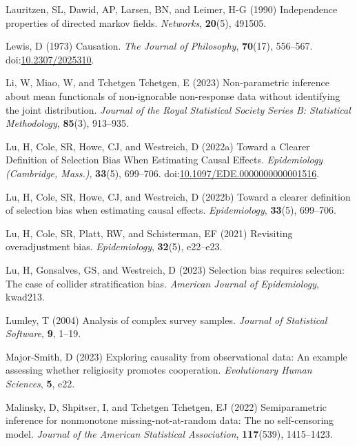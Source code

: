 \documentclass[
  singlecolumn]{article}
\newlength{\cslhangindent}
\newenvironment{CSLReferences}[2] %
 {\begin{list}{}{%
  \setlength{\itemindent}{0pt}
  \setlength{\leftmargin}{0pt}
  \setlength{\parsep}{0pt}
  \ifodd #1
   \setlength{\leftmargin}{\cslhangindent}
   \setlength{\itemindent}{-1\cslhangindent}
  \fi
  \setlength{\itemsep}{#2\baselineskip}}}
 {\end{list}}
\begin{document}
\begin{CSLReferences}{1}{0}
Lauritzen, SL, Dawid, AP, Larsen, BN, and Leimer, H-G (1990)
Independence properties of directed markov fields. \emph{Networks},
\textbf{20}(5), 491505.

Lewis, D (1973) Causation. \emph{The Journal of Philosophy},
\textbf{70}(17), 556--567.
doi:\href{https://doi.org/10.2307/2025310}{10.2307/2025310}.

Li, W, Miao, W, and Tchetgen Tchetgen, E (2023) Non-parametric inference
about mean functionals of non-ignorable non-response data without
identifying the joint distribution. \emph{Journal of the Royal
Statistical Society Series B: Statistical Methodology}, \textbf{85}(3),
913--935.

Lu, H, Cole, SR, Howe, CJ, and Westreich, D (2022a) Toward a Clearer
Definition of Selection Bias When Estimating Causal Effects.
\emph{Epidemiology (Cambridge, Mass.)}, \textbf{33}(5), 699--706.
doi:\href{https://doi.org/10.1097/EDE.0000000000001516}{10.1097/EDE.0000000000001516}.

Lu, H, Cole, SR, Howe, CJ, and Westreich, D (2022b) Toward a clearer
definition of selection bias when estimating causal effects.
\emph{Epidemiology}, \textbf{33}(5), 699--706.

Lu, H, Cole, SR, Platt, RW, and Schisterman, EF (2021) Revisiting
overadjustment bias. \emph{Epidemiology}, \textbf{32}(5), e22--e23.

Lu, H, Gonsalves, GS, and Westreich, D (2023) Selection bias requires
selection: The case of collider stratification bias. \emph{American
Journal of Epidemiology}, kwad213.

Lumley, T (2004) Analysis of complex survey samples. \emph{Journal of
Statistical Software}, \textbf{9}, 1--19.

Major-Smith, D (2023) Exploring causality from observational data: An
example assessing whether religiosity promotes cooperation.
\emph{Evolutionary Human Sciences}, \textbf{5}, e22.

Malinsky, D, Shpitser, I, and Tchetgen Tchetgen, EJ (2022)
Semiparametric inference for nonmonotone missing-not-at-random data: The
no self-censoring model. \emph{Journal of the American Statistical
Association}, \textbf{117}(539), 1415--1423.


\end{CSLReferences}
\end{document}
